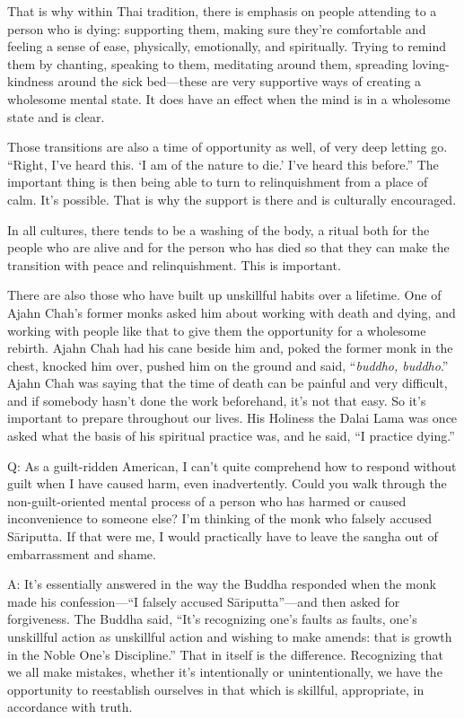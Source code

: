 That is why within Thai tradition, there is emphasis on people attending
to a person who is dying: supporting them, making sure they’re
comfortable and feeling a sense of ease, physically, emotionally, and
spiritually. Trying to remind them by chanting, speaking to them,
meditating around them, spreading loving-kindness around the sick
bed—these are very supportive ways of creating a wholesome mental state.
It does have an effect when the mind is in a wholesome state and is
clear.

Those transitions are also a time of opportunity as well, of very deep
letting go. “Right, I’ve heard this. ‘I am of the nature to die.’ I’ve
heard this before.” The important thing is then being able to turn to
relinquishment from a place of calm. It’s possible. That is why the
support is there and is culturally encouraged.

In all cultures, there tends to be a washing of the body, a ritual both
for the people who are alive and for the person who has died so that
they can make the transition with peace and relinquishment. This is
important.

There are also those who have built up unskillful habits over a
lifetime. One of Ajahn Chah’s former monks asked him about working with
death and dying, and working with people like that to give them the
opportunity for a wholesome rebirth. Ajahn Chah had his cane beside him
and, poked the former monk in the chest, knocked him over, pushed him on
the ground and said, “\emph{buddho, buddho}.” Ajahn Chah was saying that
the time of death can be painful and very difficult, and if somebody
hasn’t done the work beforehand, it’s not that easy. So it’s important
to prepare throughout our lives. His Holiness the Dalai Lama was once
asked what the basis of his spiritual practice was, and he said, “I
practice dying.”

\qaspace
Q: As a guilt-ridden American, I can’t quite comprehend how to respond
without guilt when I have caused harm, even inadvertently. Could you
walk through the non-guilt-oriented mental process of a person who has
harmed or caused inconvenience to someone else? I’m thinking of the monk
who falsely accused Sāriputta. If that were me, I would practically have
to leave the sangha out of embarrassment and shame.

\qaspace
A: It’s essentially answered in the way the Buddha responded when the
monk made his confession—“I falsely accused Sāriputta”—and then asked
for forgiveness. The Buddha said, “It’s recognizing one’s faults as
faults, one’s unskillful action as unskillful action and wishing to make
amends: that is growth in the Noble One’s Discipline.” That in itself is
the difference. Recognizing that we all make mistakes, whether it’s
intentionally or unintentionally, we have the opportunity to reestablish
ourselves in that which is skillful, appropriate, in accordance with
truth.

